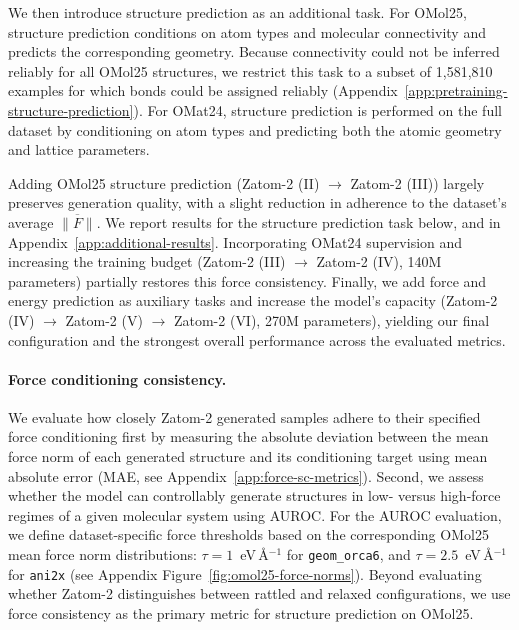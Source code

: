 \documentclass{article} %
\begin{document}
We then introduce structure prediction as an additional task. For OMol25, structure prediction conditions on atom types and molecular connectivity and predicts the corresponding geometry. Because connectivity could not be inferred reliably for all OMol25 structures, we restrict this task to a subset of 1,581,810 examples for which bonds could be assigned reliably (Appendix~\ref{app:pretraining-structure-prediction}). For OMat24, structure prediction is performed on the full dataset by conditioning on atom types and predicting both the atomic geometry and lattice parameters.

Adding OMol25 structure prediction (Zatom-2 (II) $\rightarrow$ Zatom-2 (III)) largely preserves generation quality, with a slight reduction in adherence to the dataset's average $\overline{\|F\|}$. We report results for the structure prediction task below, and in Appendix~\ref{app:additional-results}. Incorporating OMat24 supervision and increasing the training budget (Zatom-2 (III) $\rightarrow$ Zatom-2 (IV), 140M parameters) partially restores this force consistency. Finally, we add force and energy prediction as auxiliary tasks and increase the model's capacity (Zatom-2 (IV) $\rightarrow$ Zatom-2 (V) $\rightarrow$ Zatom-2 (VI), 270M parameters), yielding our final configuration and the strongest overall performance across the evaluated metrics.

\paragraph{Force conditioning consistency.} We evaluate how closely Zatom-2 generated samples adhere to their specified force conditioning first by measuring the absolute deviation between the mean force norm of each generated structure and its conditioning target using mean absolute error (MAE, see Appendix~\ref{app:force-sc-metrics}). Second, we assess whether the model can controllably generate structures in low- versus high-force regimes of a given molecular system using AUROC. For the AUROC evaluation, we define dataset-specific force thresholds based on the corresponding OMol25 mean force norm distributions:
$\tau=1$~eV\,\AA$^{-1}$ for \texttt{geom\_orca6}, and
$\tau=2.5$~eV\,\AA$^{-1}$ for
\texttt{ani2x} (see Appendix Figure~\ref{fig:omol25-force-norms}).
Beyond evaluating whether Zatom-2 distinguishes between rattled and relaxed configurations, we use force consistency as the primary metric for structure prediction on OMol25. 
\end{document}
